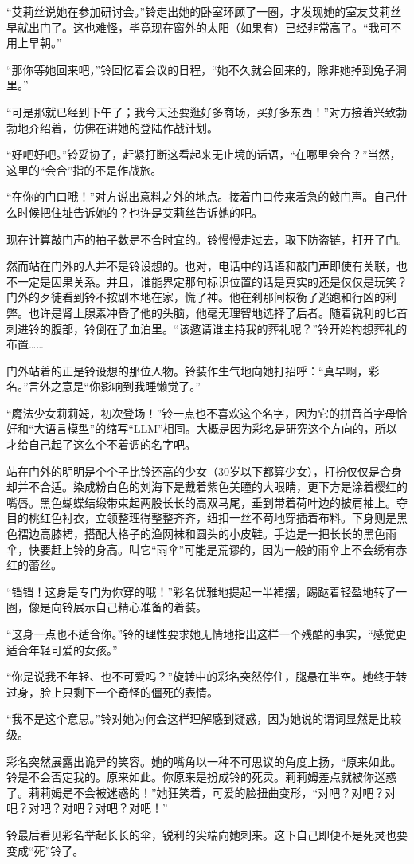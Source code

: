 “艾莉丝说她在参加研讨会。”铃走出她的卧室环顾了一圈，才发现她的室友艾莉丝早就出门了。这也难怪，毕竟现在窗外的太阳（如果有）已经非常高了。“我可不用上早朝。”

“那你等她回来吧，”铃回忆着会议的日程，“她不久就会回来的，除非她掉到兔子洞里。”

“可是那就已经到下午了；我今天还要逛好多商场，买好多东西！”对方接着兴致勃勃地介绍着，仿佛在讲她的登陆作战计划。

“好吧好吧。”铃妥协了，赶紧打断这看起来无止境的话语，“在哪里会合？”当然，这里的“会合”指的不是作战旅。

“在你的门口哦！”对方说出意料之外的地点。接着门口传来着急的敲门声。自己什么时候把住址告诉她的？也许是艾莉丝告诉她的吧。

现在计算敲门声的拍子数是不合时宜的。铃慢慢走过去，取下防盗链，打开了门。

\begin{branch}
\badend 然而站在门外的人并不是铃设想的。也对，电话中的话语和敲门声即使有关联，也不一定是因果关系。并且，谁能界定那句标识位置的话是真实的还是仅仅是玩笑？门外的歹徒看到铃不按剧本地在家，慌了神。他在刹那间权衡了逃跑和行凶的利弊。也许是肾上腺素冲昏了他的头脑，他毫无理智地选择了后者。随着锐利的匕首刺进铃的腹部，铃倒在了血泊里。“该邀请谁主持我的葬礼呢？”铃开始构想葬礼的布置……
\end{branch}

门外站着的正是铃设想的那位人物。铃装作生气地向她打招呼：“真早啊，彩名。”言外之意是“你影响到我睡懒觉了。”

“魔法少女莉莉姆，初次登场！”铃一点也不喜欢这个名字，因为它的拼音首字母恰好和“大语言模型”的缩写“LLM”相同。大概是因为彩名是研究这个方向的，所以才给自己起了这么个不着调的名字吧。

站在门外的明明是个个子比铃还高的少女（30岁以下都算少女），打扮仅仅是合身却并不合适。染成粉白色的刘海下是戴着紫色美瞳的大眼睛，更下方是涂着樱红的嘴唇。黑色蝴蝶结缎带束起两股长长的高双马尾，垂到带着荷叶边的披肩袖上。夺目的桃红色衬衣，立领整理得整整齐齐，纽扣一丝不苟地穿插着布料。下身则是黑色褶边高膝裙，搭配大格子的渔网袜和圆头的小皮鞋。手边是一把长长的黑色雨伞，快要赶上铃的身高。叫它“雨伞”可能是荒谬的，因为一般的雨伞上不会绣有赤红的蕾丝。

“铛铛！这身是专门为你穿的哦！”彩名优雅地提起一半裙摆，踢跶着轻盈地转了一圈，像是向铃展示自己精心准备的着装。

\begin{branch}
\badend “这身一点也不适合你。”铃的理性要求她无情地指出这样一个残酷的事实，“感觉更适合年轻可爱的女孩。”

“你是说我不年轻、也不可爱吗？”旋转中的彩名突然停住，腿悬在半空。她终于转过身，脸上只剩下一个奇怪的僵死的表情。

“我不是这个意思。”铃对她为何会这样理解感到疑惑，因为她说的谓词显然是比较级。

彩名突然展露出诡异的笑容。她的嘴角以一种不可思议的角度上扬，“原来如此。铃是不会否定我的。原来如此。你原来是扮成铃的死灵。莉莉姆差点就被你迷惑了。莉莉姆是不会被迷惑的！”她狂笑着，可爱的脸扭曲变形，“对吧？对吧？对吧？对吧？对吧？对吧？对吧！”

铃最后看见彩名举起长长的伞，锐利的尖端向她刺来。这下自己即便不是死灵也要变成“死”铃了。
\end{branch}

